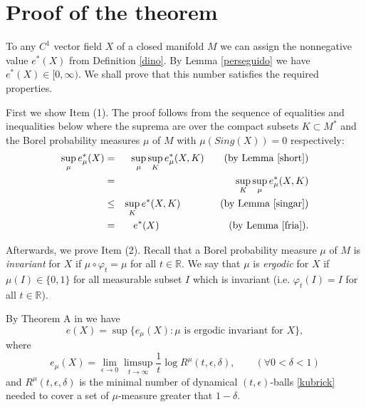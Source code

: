 \documentclass{amsart}
\numberwithin{equation}{section}
\begin{document}
\section{Proof of the theorem}
\label{hup}




\noindent
To any $C^1$ vector field $X$ of a closed manifold $M$
we can assign the nonnegative value $e^*(X)$ from Definition \ref{dino}.
By Lemma \ref{perseguido} we have $e^*(X)\in [0,\infty)$.
We shall prove that this number satisfies the required properties.

First we show Item (1).
The proof follows from the sequence of equalities and inequalities below where the suprema are over the compact subsets $K\subset M^*$ and the Borel probability measures $\mu$ of $M$ with $\mu(Sing(X))=0$ respectively:
\begin{eqnarray*}
\sup_\mu e^*_\mu(X)&=&\sup_\mu\sup_K e^*_\mu(X,K)\quad\quad\mbox{(by Lemma \ref{short})}\\
&=&\sup_K\sup_\mu e^*_\mu(X,K)\\
&\leq& \sup_K e^*(X,K)\quad\quad\quad\quad\mbox{(by Lemma \ref{singar})}\\
&=&e^*(X)\quad\quad\quad\quad\quad\quad\quad\mbox{(by Lemma \ref{fria}).}
\end{eqnarray*}

Afterwards, we prove Item (2).
Recall that a Borel probability measure $\mu$ of $M$ is
{\em invariant} for $X$ if $\mu\circ\varphi_t=\mu$ for all $t\in\mathbb{R}$.
We say that $\mu$ is {\em ergodic} for $X$ if $\mu(I)\in\{0,1\}$ for all measurable subset $I$ which is invariant (i.e. $\varphi_t(I)=I$ for all $t\in \mathbb{R}$).

By Theorem A in \cite{s} we have
\begin{equation}
\label{gigante}
e(X)=\sup\{e_\mu(X):\mu\mbox{ is ergodic invariant for } X\},
\end{equation}
where
$$
e_\mu(X)=\lim_{\epsilon\to0}\limsup_{t\to\infty}\frac{1}t\log R^\mu(t,\epsilon,\delta),\quad\quad(\forall 0<\delta<1)
$$
and $R^\mu(t,\epsilon,\delta)$ is the minimal number of dynamical $(t,\epsilon)$-balls \eqref{kubrick} needed to cover a set of $\mu$-measure greater that $1-\delta$.
\end{document}
